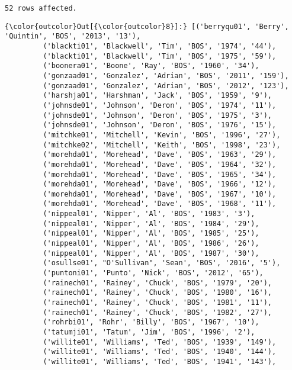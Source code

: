 \documentclass[11pt]{article}
\begin{document}
    \begin{Verbatim}[commandchars=\\\{\}]
52 rows affected.

    \end{Verbatim}

\begin{Verbatim}[commandchars=\\\{\}]
{\color{outcolor}Out[{\color{outcolor}8}]:} [('berryqu01', 'Berry', 'Quintin', 'BOS', '2013', '13'),
         ('blackti01', 'Blackwell', 'Tim', 'BOS', '1974', '44'),
         ('blackti01', 'Blackwell', 'Tim', 'BOS', '1975', '59'),
         ('boonera01', 'Boone', 'Ray', 'BOS', '1960', '34'),
         ('gonzaad01', 'Gonzalez', 'Adrian', 'BOS', '2011', '159'),
         ('gonzaad01', 'Gonzalez', 'Adrian', 'BOS', '2012', '123'),
         ('harshja01', 'Harshman', 'Jack', 'BOS', '1959', '9'),
         ('johnsde01', 'Johnson', 'Deron', 'BOS', '1974', '11'),
         ('johnsde01', 'Johnson', 'Deron', 'BOS', '1975', '3'),
         ('johnsde01', 'Johnson', 'Deron', 'BOS', '1976', '15'),
         ('mitchke01', 'Mitchell', 'Kevin', 'BOS', '1996', '27'),
         ('mitchke02', 'Mitchell', 'Keith', 'BOS', '1998', '23'),
         ('morehda01', 'Morehead', 'Dave', 'BOS', '1963', '29'),
         ('morehda01', 'Morehead', 'Dave', 'BOS', '1964', '32'),
         ('morehda01', 'Morehead', 'Dave', 'BOS', '1965', '34'),
         ('morehda01', 'Morehead', 'Dave', 'BOS', '1966', '12'),
         ('morehda01', 'Morehead', 'Dave', 'BOS', '1967', '10'),
         ('morehda01', 'Morehead', 'Dave', 'BOS', '1968', '11'),
         ('nippeal01', 'Nipper', 'Al', 'BOS', '1983', '3'),
         ('nippeal01', 'Nipper', 'Al', 'BOS', '1984', '29'),
         ('nippeal01', 'Nipper', 'Al', 'BOS', '1985', '25'),
         ('nippeal01', 'Nipper', 'Al', 'BOS', '1986', '26'),
         ('nippeal01', 'Nipper', 'Al', 'BOS', '1987', '30'),
         ('osullse01', "O'Sullivan", 'Sean', 'BOS', '2016', '5'),
         ('puntoni01', 'Punto', 'Nick', 'BOS', '2012', '65'),
         ('rainech01', 'Rainey', 'Chuck', 'BOS', '1979', '20'),
         ('rainech01', 'Rainey', 'Chuck', 'BOS', '1980', '16'),
         ('rainech01', 'Rainey', 'Chuck', 'BOS', '1981', '11'),
         ('rainech01', 'Rainey', 'Chuck', 'BOS', '1982', '27'),
         ('rohrbi01', 'Rohr', 'Billy', 'BOS', '1967', '10'),
         ('tatumji01', 'Tatum', 'Jim', 'BOS', '1996', '2'),
         ('willite01', 'Williams', 'Ted', 'BOS', '1939', '149'),
         ('willite01', 'Williams', 'Ted', 'BOS', '1940', '144'),
         ('willite01', 'Williams', 'Ted', 'BOS', '1941', '143'),

\end{Verbatim}
\end{document}
